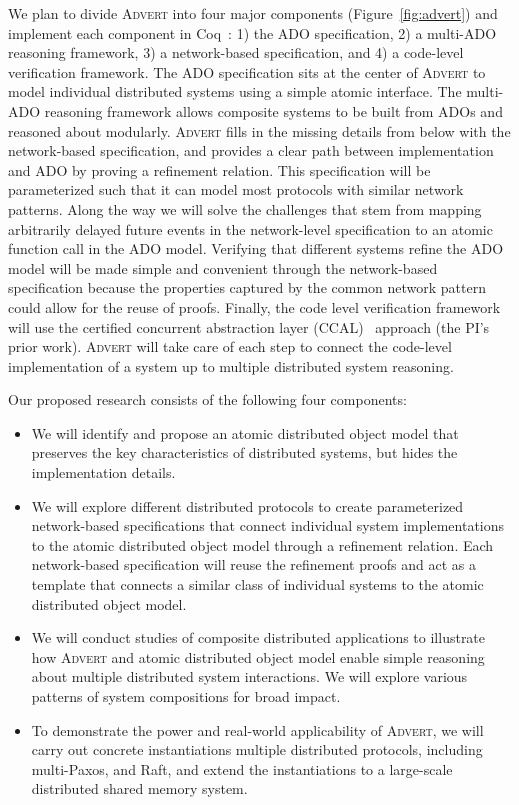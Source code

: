 \documentclass[11pt]{article}
\newcommand{\sysname}{\textsc{Advert}}
\begin{document}
We plan to divide \sysname{} into four major components
(Figure~\ref{fig:advert}) and implement each component in
Coq~\cite{coq}: 1) the ADO specification, 2) a multi-ADO reasoning
framework, 3) a network-based specification, and 4) a code-level
verification framework.  The ADO specification sits at the center of
\sysname{} to model individual distributed systems using a simple
atomic interface. The multi-ADO reasoning framework allows composite
systems to be built from ADOs and reasoned about modularly. \sysname{}
fills in the missing details from below with the network-based
specification, and provides a clear path between implementation and
ADO by proving a refinement relation. This specification will be
parameterized such that it can model most protocols with similar
network patterns. Along the way we will solve the challenges that stem
from mapping arbitrarily delayed future events in the network-level
specification to an atomic function call in the ADO model. Verifying
that different systems refine the ADO model will be made simple and
convenient through the network-based specification because the
properties captured by the common network pattern could allow for the
reuse of proofs. Finally, the code level verification framework will
use the certified concurrent abstraction layer
(CCAL)~\cite{concurrency} approach (the PI's prior work).  \sysname{}
will take care of each step to connect the code-level implementation
of a system up to multiple distributed system reasoning.

Our proposed research consists of the following four components:
\begin{itemize}%
\item We will identify and propose an atomic distributed object model
  that preserves the key characteristics of distributed systems, but
  hides the implementation details.
\item We will explore different distributed protocols to create
  parameterized network-based specifications that connect individual
  system implementations to the atomic distributed object model
  through a refinement relation. Each network-based specification will
  reuse the refinement proofs and act as a template that connects a
  similar class of individual systems to the atomic distributed object
  model.
\item We will conduct studies of composite distributed applications to
  illustrate how \sysname{} and atomic distributed object model enable
  simple reasoning about multiple distributed system interactions. We
  will explore various patterns of system compositions for broad
  impact.
\item To demonstrate the power and real-world applicability of
  \sysname{}, we will carry out concrete instantiations multiple
  distributed protocols, including multi-Paxos, and Raft, and extend
  the instantiations to a large-scale distributed shared memory
  system.
\end{itemize}
\end{document}
